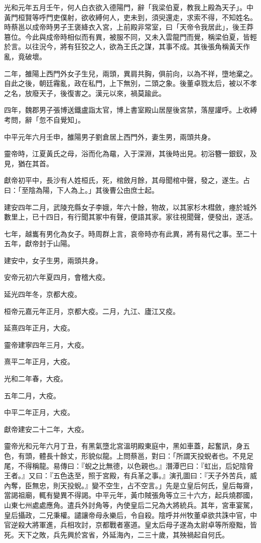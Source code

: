 \begin{pinyinscope}
光和元年五月壬午，何人白衣欲入德陽門，辭「我梁伯夏，教我上殿為天子」。中黃門桓賢等呼門吏僕射，欲收縛何人，吏未到，須臾還走，求索不得，不知姓名。時蔡邕以成帝時男子王褒絳衣入宮，上前殿非常室，曰「天帝令我居此」，後王莽篡位。今此與成帝時相似而有異，被服不同，又未入雲龍門而覺，稱梁伯夏，皆輕於言。以往況今，將有狂狡之人，欲為王氏之謀，其事不成。其後張角稱黃天作亂，竟破壞。

二年，雒陽上西門外女子生兒，兩頭，異肩共胸，俱前向，以為不祥，墮地棄之。自此之後，朝廷霿亂，政在私門，上下無別，二頭之象。後董卓戮太后，被以不孝之名，放廢天子，後復害之。漢元以來，禍莫踰此。

四年，魏郡男子張博送鐵盧詣太官，博上書室殿山居屋後宮禁，落屋讙呼。上收縛考問，辭「忽不自覺知」。

中平元年六月壬申，雒陽男子劉倉居上西門外，妻生男，兩頭共身。

靈帝時，江夏黃氏之母，浴而化為黿，入于深淵，其後時出見。初浴簪一銀釵，及見，猶在其首。

獻帝初平中，長沙有人姓桓氏，死，棺斂月餘，其母聞棺中聲，發之，遂生。占曰：「至陰為陽，下人為上。」其後曹公由庶士起。

建安四年二月，武陵充縣女子李娥，年六十餘，物故，以其家杉木槥斂，瘞於城外數里上，已十四日，有行聞其冢中有聲，便語其家。家往視聞聲，便發出，遂活。

七年，越巂有男化為女子。時周群上言，哀帝時亦有此異，將有易代之事。至二十五年，獻帝封于山陽。

建安中，女子生男，兩頭共身。

安帝元初六年夏四月，會稽大疫。

延光四年冬，京都大疫。

桓帝元嘉元年正月，京都大疫。二月，九江、廬江又疫。

延熹四年正月，大疫。

靈帝建寧四年三月，大疫。

熹平二年正月，大疫。

光和二年春，大疫。

五年二月，大疫。

中平二年正月，大疫。

獻帝建安二十二年，大疫。

靈帝光和元年六月丁丑，有黑氣墮北宮溫明殿東庭中，黑如車蓋，起奮訊，身五色，有頭，體長十餘丈，形貌似龍。上問蔡邕，對曰：「所謂天投蜺者也。不見足尾，不得稱龍。易傳曰：『蜺之比無德，以色親也。』潛潭巴曰：『虹出，后妃陰脅王者。』又曰：『五色迭至，照于宮殿，有兵革之事。』演孔圖曰：『天子外苦兵，威內奪，臣無忠，則天投蜺。』變不空生，占不空言。」先是立皇后何氏，皇后每齋，當謁祖廟，輒有變異不得謁。中平元年，黃巾賊張角等立三十六方，起兵燒郡國，山東七州處處應角。遣兵外討角等，內使皇后二兄為大將統兵。其年，宮車宴駕，皇后攝政，二兄秉權。譴讓帝母永樂后，令自殺。陰呼并州牧董卓欲共誅中官，中官逆殺大將軍進，兵相攻討，京都戰者塞道。皇太后母子遂為太尉卓等所廢黜，皆死。天下之敗，兵先興於宮省，外延海內，二三十歲，其殃禍起自何氏。


\end{pinyinscope}